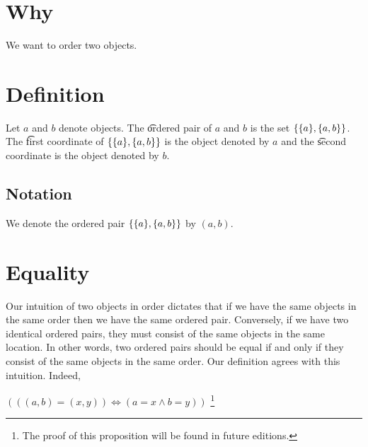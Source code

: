 
\section*{Why}

We want to order two objects.

\section*{Definition}

Let $a$ and $b$ denote objects.
The \t{ordered pair} of $a$ and $b$ is the set $\{\{a\}, \{a, b\}\}$.
The \t{first coordinate} of $\{\{a\}, \{a, b\}\}$ is the object denoted by $a$ and the \t{second coordinate} is the object denoted by $b$.

\subsection*{Notation}

We denote the ordered pair $\{\{a\},\{a,b\}\}$ by $(a, b)$.

\section*{Equality}

Our intuition of two objects in order dictates that if we have the same objects in the same order then we have the same ordered pair.
Conversely, if we have two identical ordered pairs, they must consist of the same objects in the same location.
In other words, two ordered pairs should be equal if and only if they consist of the same objects in the same order.
Our definition agrees with this intuition.
Indeed,
\begin{proposition}
$(((a, b) = (x, y)) \iff (a = x \land b = y))$
    \ifhmode\unskip\fi\footnote{
The proof of this proposition will be found in future editions.


    }\end{proposition}

\blankpage
